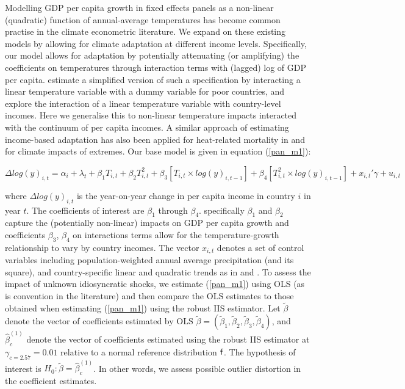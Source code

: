 \documentclass[11pt, letterpaper]{article}
\numberwithin{algorithm}{section}
\numberwithin{assumption}{section}
\numberwithin{lemma}{section}
\numberwithin{theorem}{section}
\numberwithin{corollary}{section}
\numberwithin{remark}{section}
\numberwithin{equation}{section}
\numberwithin{figure}{section}
\numberwithin{table}{section}
\begin{document}
Modelling GDP per capita growth in fixed effects panels as a non-linear (quadratic) function of annual-average temperatures has become common practise in the climate econometric literature. We expand on these existing models by allowing for climate adaptation at different income levels. Specifically, our model allows for adaptation by potentially attenuating (or amplifying) the coefficients on temperatures through interaction terms with (lagged) log of GDP per capita. \citet{dell2012temperature} estimate a simplified version of such a specification by interacting a linear temperature variable with a dummy variable for poor countries, and \citet{burke2015global} explore the interaction of a linear temperature variable with country-level incomes. Here we generalise this to non-linear temperature impacts interacted with the continuum of per capita incomes. A similar approach of estimating income-based adaptation has also been applied for heat-related mortality in \citet{carleton2020valuing} and \citet{schwarz2020modelling} for climate impacts of extremes. Our base model is given in equation (\ref{pan_m1}):
\begin{small}
\begin{equation}
\label{pan_m1}
\Delta log(y)_{i,t} = \alpha_i + \lambda_t + \beta_1 T_{i,t} + \beta_2 T^2_{i,t} + \beta_3 \left[ T_{i,t} \times  log(y)_{i, t-1} \right] + \beta_4 \left[  T^2_{i,t} \times  log(y)_{i, t-1} \right] + x_{i,t}'\gamma + u_{i,t}
\end{equation}
\end{small}
where $\Delta log(y)_{i,t}$ is the year-on-year change in per capita income in country $i$ in year $t$. The coefficients of interest are $\beta_1$ through $\beta_4$. specifically $\beta_1$ and $\beta_2$ capture the (potentially non-linear) impacts on GDP per capita growth and coefficients $\beta_3$, $\beta_4$ on interactions terms allow for the temperature-growth relationship to vary by country incomes. The vector $x_{i,t}$ denotes a set of control variables including population-weighted annual average precipitation (and its square), and country-specific linear and quadratic trends as in \citet{burke2015global} and \citet{pretis2018uncertain}. To assess the impact of unknown idiosyncratic shocks, we estimate (\ref{pan_m1}) using OLS (as is convention in the literature) and then compare the OLS estimates to those obtained when estimating (\ref{pan_m1}) using the robust IIS estimator. Let $\tilde{\beta}$ denote the vector of coefficients estimated by OLS $\tilde{\beta}=(\tilde{\beta}_1, \tilde{\beta}_2, \tilde{\beta}_3, \tilde{\beta}_4)$, and $\hat{\beta}^{( 1)}_{c}$ denote the vector of coefficients estimated using the robust IIS estimator at $\gamma_{c=2.57}=0.01$ relative to a normal reference distribution ${\sf f}$. The hypothesis of interest is $H_0: \tilde{\beta} = \hat{\beta}^{( 1)}_{c}$. In other words, we assess possible outlier distortion in the coefficient estimates.
\end{document}
